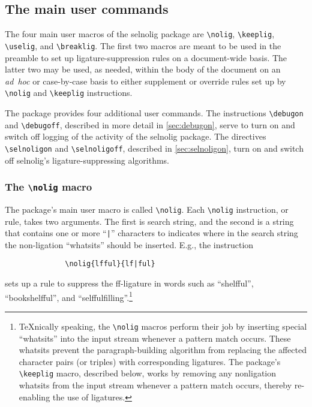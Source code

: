 \documentclass[11pt]{article}
\newcommand{\pkg}[1]{\textsf{#1}}
\newcommand{\cmmd}[1]{\texttt{\textbackslash #1}}
\begin{document}
\subsection{The main user commands} \label{sec:syntax}

The four main user macros of the \pkg{selnolig} package are \cmmd{nolig}, \cmmd{keeplig}, \cmmd{uselig}, and \cmmd{breaklig}. The first two macros are meant to be used in the preamble to set up ligature-suppression rules on a document-wide basis. The latter two may be used, as needed, within the body of the document on an \emph{ad~hoc} or case-by-case basis to either supplement or override rules set up by \cmmd{nolig} and \cmmd{keeplig} instructions.

The package provides four additional user commands. The instructions \cmmd{debugon} and \cmmd{debugoff},  described in more detail in \cref{sec:debugon}, serve to turn on and switch off logging of the activity of the \pkg{selnolig} package. The directives \cmmd{selnoligon} and \cmmd{selnoligoff}, described in \cref{sec:selnoligon}, turn on and switch off \pkg{selnolig}'s ligature-suppressing algorithms.



\subsubsection{The \cmmd{nolig} macro}
\label{sec:nolig}

The package's main user macro is called \cmmd{nolig}. Each \cmmd{nolig} instruction, or rule, takes two arguments. The first is search string, and the second is a string that contains one or more ``\Verb+|+'' characters to indicates where in the search string the non-ligation \enquote{whatsits} should be inserted. E.g., the instruction
\begin{Verbatim}
              \nolig{lfful}{lf|ful}
\end{Verbatim}
sets up a rule to suppress the ff-ligature in words such as \enquote{shelfful}, \enquote{bookshelfful}, and \enquote{selffulfilling}.\footnote{\TeX nically speaking, the \cmmd{nolig} macros perform their job by inserting special \enquote{whatsits} into the input stream whenever a pattern match occurs. These whatsits prevent the paragraph-building algorithm from replacing the affected character pairs (or triples) with corresponding ligatures. The package's \cmmd{keeplig} macro, described below, works by removing any nonligation whatsits from the input stream whenever a pattern match occurs, thereby re-enabling the use of ligatures.}
\end{document}
